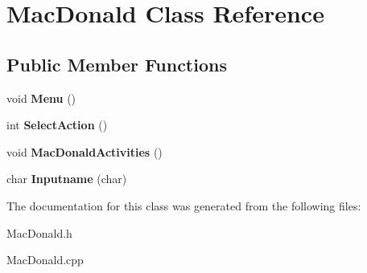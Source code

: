 \hypertarget{class_mac_donald}{}\section{Mac\+Donald Class Reference}
\label{class_mac_donald}
\subsection*{Public Member Functions}
\begin{DoxyCompactItemize}
\item 
\mbox{\label{class_mac_donald_af1307eccf048a825243c17c1be3ed178}} 
void {\bfseries Menu} ()
\item 
\mbox{\label{class_mac_donald_a9c0f7d6ff84ae4200791722d27546596}} 
int {\bfseries Select\+Action} ()
\item 
\mbox{\label{class_mac_donald_aa3658fd709164100735bdb280d72b9a0}} 
void {\bfseries Mac\+Donald\+Activities} ()
\item 
\mbox{\label{class_mac_donald_a72b66aa4de048466d5cb5efe4a2f2e80}} 
char {\bfseries Inputname} (char)
\end{DoxyCompactItemize}


The documentation for this class was generated from the following files\+:\begin{DoxyCompactItemize}
\item 
Mac\+Donald.\+h\item 
Mac\+Donald.\+cpp\end{DoxyCompactItemize}
